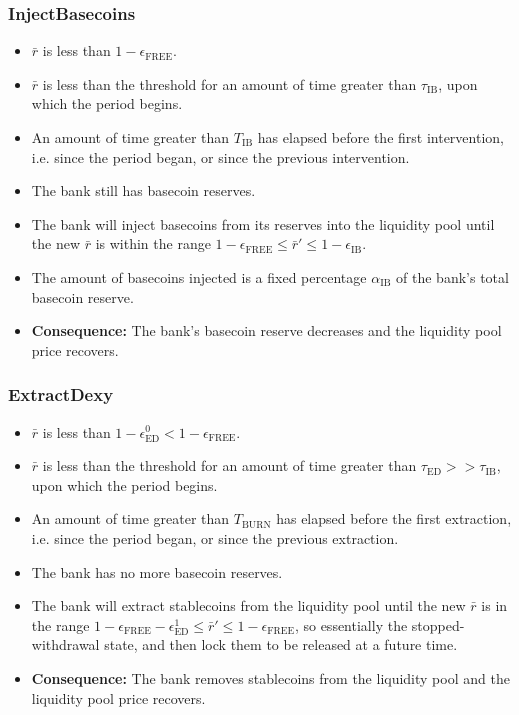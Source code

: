 \documentclass{ifcolog}
\newcommand{\rr}{\bar{r}}
\begin{document}
\subsubsection{InjectBasecoins}
  \begin{itemize}
    \item $\rr$ is less than $1 - \epsilon_{\textrm{FREE}}$.
    \item $\rr$ is less than the threshold for an amount of time greater than $\tau_{\textrm{IB}}$, upon which the period begins.
    \item An amount of time greater than $T_{\textrm{IB}}$ has elapsed before the first intervention, i.e. since the period began, or since the previous intervention. 
    \item The bank still has basecoin reserves.
    \item The bank will inject basecoins from its reserves into the liquidity pool 
          until the new $\rr$ is within the range $1 - \epsilon_{\textrm{FREE}} \le \rr' \le 1-\epsilon_{\textrm{IB}}$.
    \item The amount of basecoins injected is a fixed percentage $\alpha_{\textrm{IB}}$ of the bank's total basecoin reserve.
    \item \textbf{Consequence:} The bank's basecoin reserve decreases and the liquidity pool price recovers.
  \end{itemize}

\subsubsection{ExtractDexy}
  \begin{itemize}
    \item $\rr$ is less than $1 - \epsilon_{\textrm{ED}}^{0} < 1 - \epsilon_{\textrm{FREE}}$.
    \item $\rr$ is less than the threshold for an amount of time greater than $\tau_{\textrm{ED}} >> \tau_{\textrm{IB}}$, upon which the period begins.
    \item An amount of time greater than $T_{\textrm{BURN}}$ has elapsed before the first extraction, i.e. since the period began, or since the previous extraction. 
    \item The bank has no more basecoin reserves.
    \item The bank will extract stablecoins from the liquidity pool until the new $\rr$ is in 
          the range $1 - \epsilon_{\textrm{FREE}} - \epsilon_{\textrm{ED}}^{1} \le \rr' \le 1-\epsilon_{\textrm{FREE}}$, 
          so essentially the stopped-withdrawal state, and then lock them to be released at a future time.
    \item \textbf{Consequence:} The bank removes stablecoins from the liquidity pool and the liquidity pool price recovers.
  \end{itemize}
\end{document}
